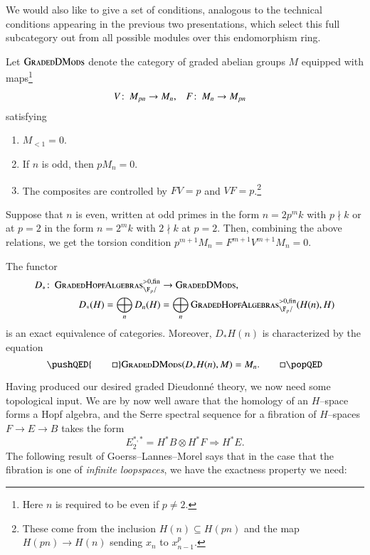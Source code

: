 We would also like to give a set of conditions, analogous to the technical conditions appearing in the previous two presentations, which select this full subcategory out from all possible modules over this endomorphism ring.

\begin{definition}
Let $\normalfont\textsc{GradedDMods}$ denote the category of graded abelian groups $M$ equipped with maps\footnote{Here $n$ is required to be even if $p \ne 2$.}
\begin{align*}
V\colon\thinspace M_{pn} & \to M_n, &
F\colon\thinspace M_n & \to M_{pn}
\end{align*}
satisfying
\begin{enumerate}
\item $M_{< 1} = 0$.
\item If $n$ is odd, then $pM_n = 0$.
\item The composites are controlled by $FV = p$ and $VF = p$.\footnote{These come from the inclusion $H(n) \subseteq H(pn)$ and the map $H(pn) \to H(n)$ sending $x_n$ to $x_{n-1}^p$.}
\end{enumerate}
\end{definition}

\begin{remark}
Suppose that $n$ is even, written at odd primes in the form $n = 2p^m k$ with $p \nmid k$ or at $p = 2$ in the form $n = 2^m k$ with $2 \nmid k$ at $p = 2$.  Then, combining the above relations, we get the torsion condition $p^{m+1} M_n = F^{m+1} V^{m+1} M_n = 0$.
\end{remark}

\begin{theorem}
The functor
\begin{align*}
D_*\co \CatOf{GradedHopfAlgebras}^{>0, \fin}_{\F_p/} & \to \CatOf{GradedDMods}, \\
D_*(H) = \bigoplus_n D_n(H) & = \bigoplus_n \CatOf{GradedHopfAlgebras}^{>0, \fin}_{\F_p/}(H(n), H)
\end{align*}
is an exact equivalence of categories.  Moreover, $D_* H(n)$ is characterized by the equation
\[\pushQED{\qed}
\CatOf{GradedDMods}(D_* H(n), M) = M_n. \qedhere
\popQED\]
\end{theorem}

Having produced our desired graded Dieudonn\'e theory, we now need some topological input.  We are by now well aware that the homology of an $H$--space forms a Hopf algebra, and the Serre spectral sequence for a fibration of $H$--spaces $F \to E \to B$ takes the form \[E_2^{*, *} = H^* B \otimes H^* F \Rightarrow H^* E.\]  The following result of Goerss--Lannes--Morel says that in the case that the fibration is one of \emph{infinite loopspaces}, we have the exactness property we need:

